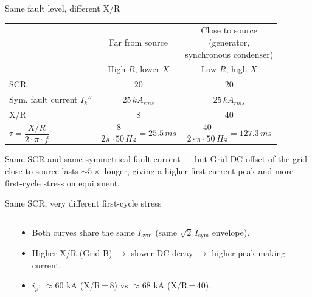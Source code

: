 
\begin{frame}{Same fault level, different X/R}
\begin{tabular}{@{}l c c@{}}
        & Far from source & \makecell[c]{Close to source \\ (generator, \\ synchronous condenser)} \\
        & High $R$, lower $X$& Low $R$, high $X$\\
        \midrule
        SCR & $20$ & $20$ \\
        Sym. fault current $I_k''$& $25\,kA_{rms}$ & $25\,kA_{rms}$ \\
        X/R & $8$ & $40$ \\
         $\tau=\dfrac{X/R}{2 \cdot \pi \cdot f}$ & $\dfrac{8}{2\pi\cdot 50\,Hz}=25.5\,ms$ & $\dfrac{40}{2 \cdot \pi \cdot 50\,Hz}=127.3\,ms$

  \end{tabular}

  \begin{block}{}
    \small Same SCR and same symmetrical fault current — but Grid DC offset of the grid close to source
    lasts $\sim\!5\times$ longer, giving a higher first current peak and more
    first-cycle stress on equipment.
  \end{block}  
\end{frame}


\begin{frame}{Same SCR, very different first-cycle stress}
  \begin{columns}[c,onlytextwidth]
    \begin{column}{0.6\textwidth}\centering
    \end{column}
    \begin{column}{0.38\textwidth}
      \begin{itemize}
        \setlength{\itemsep}{0.6em}
        \item Both curves share the same $I_{\mathrm{sym}}$ (same $\sqrt2\,I_{\mathrm{sym}}$ envelope).
        \item Higher X/R (Grid B) $\rightarrow$ slower DC decay $\rightarrow$
              higher peak making current.
        \item $i_p$: $\approx 60$ kA (X/R\,=\,8) vs $\approx 68$ kA (X/R\,=\,40).
      \end{itemize}
    \end{column}
  \end{columns}
\end{frame}


